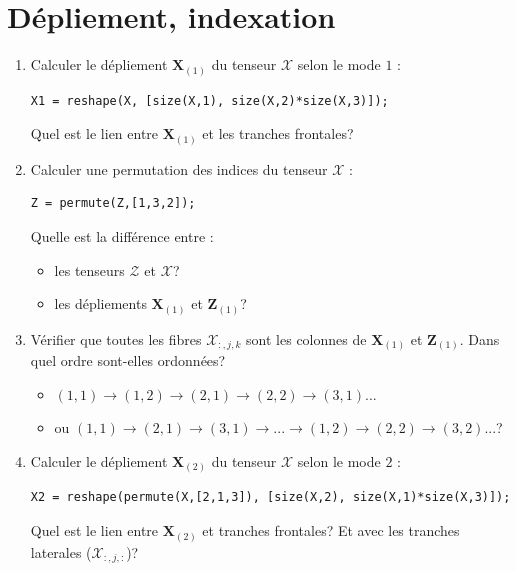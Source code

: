 \section{Dépliement, indexation}
\begin{enumerate}
\item Calculer le dépliement  $\mathbf{X}_{(1)}$ du tenseur $\mathcal{X}$ selon le mode $1$ : 
\begin{lstlisting}
X1 = reshape(X, [size(X,1), size(X,2)*size(X,3)]);
\end{lstlisting}

Quel est le lien entre $\mathbf{X}_{(1)}$ et les tranches frontales?
\item Calculer une permutation des indices du tenseur $\mathcal{X}$ :
\begin{lstlisting}
Z = permute(Z,[1,3,2]);
\end{lstlisting}
Quelle est la différence entre :
\begin{itemize}
\item les tenseurs $\mathcal{Z}$ et $\mathcal{X}$?
\item les dépliements $\mathbf{X}_{(1)}$ et $\mathbf{Z}_{(1)}$?
\end{itemize}

\item Vérifier  que toutes les fibres $\mathcal{X}_{:,j,k}$ sont les colonnes de $\mathbf{X}_{(1)}$ et $\mathbf{Z}_{(1)}$. Dans quel ordre sont-elles ordonnées?
\begin{itemize}
\item $(1,1) \to (1,2) \to (2,1) \to  (2,2) \to (3,1) ...$
\item ou $(1,1) \to (2,1) \to (3,1) \to ... \to (1,2) \to (2,2)\to (3,2)  ...$?
\end{itemize}


\item Calculer le dépliement  $\mathbf{X}_{(2)}$ du tenseur $\mathcal{X}$ selon le mode $2$ : 
\begin{lstlisting}
X2 = reshape(permute(X,[2,1,3]), [size(X,2), size(X,1)*size(X,3)]);
\end{lstlisting}

Quel est le  lien entre $\mathbf{X}_{(2)}$ et tranches frontales? 
Et avec les tranches laterales ($\mathcal{X}_{:,j,:}$)?
\end{enumerate}

